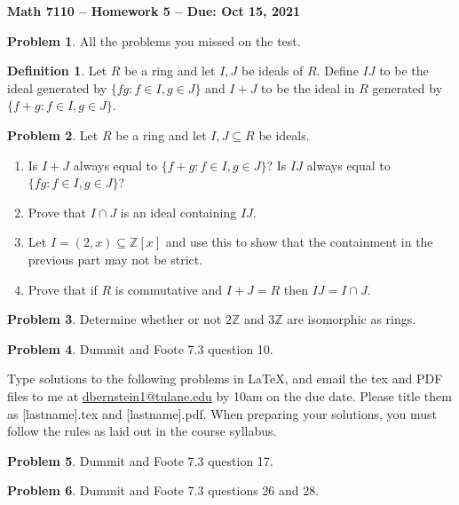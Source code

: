 \documentclass[letterpaper,11pt]{amsart}
\theoremstyle{plain}
\theoremstyle{definition}
\newtheorem*{defn*}{Definition}
\newtheorem{pr}{Problem}
\theoremstyle{remark}
\begin{document}
\Large

\begin{center}
{\bf Math 7110 -- Homework  5 --  Due:  Oct 15, 2021}
\end{center}

\normalsize


\medskip


\begin{pr}
    All the problems you missed on the test.
\end{pr}

\begin{defn*}
    Let $R$ be a ring and let $I,J$ be ideals of $R$. Define $IJ$ to be the ideal generated by $\{fg: f \in I, g \in J\}$
    and $I + J$ to be the ideal in $R$ generated by $\{f + g : f \in I, g \in J\}$.
\end{defn*}

\begin{pr}
    Let $R$ be a ring and let $I,J\subseteq R$ be ideals. 
    \begin{enumerate}
        \item Is $I + J$ always equal to $\{f+g:f \in I, g \in J\}$? Is $IJ$ always equal to $\{fg : f \in I, g \in J\}$?
        \item Prove that $I\cap J$ is an ideal containing $IJ$.
        \item Let $I = (2,x) \subseteq \mathbb{Z}[x]$ and use this to show that the containment in the previous part may not be strict.
        \item Prove that if $R$ is commutative and $I+J=R$ then $IJ = I\cap J$.
    \end{enumerate}
\end{pr}


\begin{pr}
    Determine whether or not $2\mathbb{Z}$ and $3\mathbb{Z}$ are isomorphic as rings.
\end{pr}

\begin{pr}
    Dummit and Foote 7.3 question 10.
\end{pr}


\bigskip

Type solutions to the following problems in \LaTeX, and email the tex and PDF files to me at \url{dbernstein1@tulane.edu} by 10am on the due date.
Please title them as [lastname].tex and [lastname].pdf.
When preparing your solutions, you must follow the rules as laid out in the course syllabus.

\vspace{.5cm}


\begin{pr}
    Dummit and Foote 7.3 question 17.
\end{pr}


\begin{pr}
    Dummit and Foote 7.3 questions 26 and 28.
\end{pr}
\end{document}
